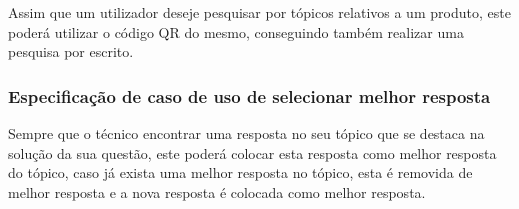Assim que um utilizador deseje pesquisar por tópicos relativos a um produto, este poderá utilizar 
o código QR do mesmo, conseguindo também realizar uma pesquisa por escrito.    






% 

% 



% 


\subsubsection{Especificação de caso de uso de selecionar melhor resposta}

Sempre que o técnico encontrar uma resposta no seu tópico que se destaca na solução da sua questão, 
este poderá colocar esta resposta como melhor resposta do tópico, caso já exista uma melhor resposta no 
tópico, esta é removida de melhor resposta e a nova resposta é colocada como melhor resposta.



\newpage


